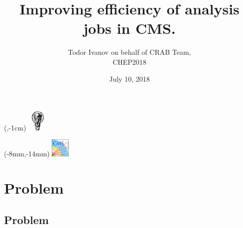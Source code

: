 \documentclass[8pt,mathserif,a4paper,oneside,pdf]{beamer}
\begin{document}

\date{ July 10, 2018}
\title[Improving efficiency of analysis jobs in CMS | CHEP2018]{Improving efficiency of analysis jobs in CMS. \\}
\author[Todor Ivanov, University of Sofia ``St. Kliment Ohridski'']{Todor Ivanov on behalf of CRAB Team,\\
CHEP2018}


\begin{frame}{}

\begin{textblock*}{100mm}(\textwidth,-1cm)
    \includegraphics[height=1cm,width=1cm,keepaspectratio]{images/logo_su}
\end{textblock*}

\begin{textblock*}{100mm}(-8mm,-14mm)
    \includegraphics[height=9mm,width=9mm,keepaspectratio]{images/logo_CMS}
\end{textblock*}

  \begin{minipage}[t]{1\textwidth}
    \begin{center}
      \vspace{-1cm}
    \end{center}
  \end{minipage}
 \noindent\makebox[\linewidth]{\rule{\paperwidth}{1pt}}
 \titlepage

 \vfill

\end{frame}


\section[Problem]{Problem}
\subsection[Problem]{Problem}
\end{document}
